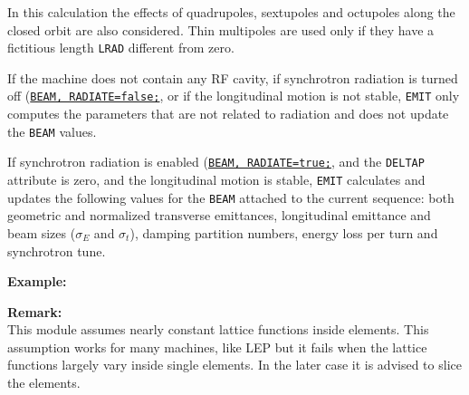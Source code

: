 In this calculation the effects of quadrupoles, sextupoles and
octupoles along the closed orbit are also considered. Thin multipoles are
used only if they have a fictitious length \texttt{LRAD} different from zero.  

If the machine does not contain any RF cavity, if synchrotron radiation is
turned off (\hyperref[sec:beam]{\texttt{BEAM, RADIATE=false;}}, or if the longitudinal
motion is not stable, \texttt{EMIT} only computes the parameters that
are not related to radiation and does not update the \texttt{BEAM} values.

If synchrotron radiation is enabled (\hyperref[sec:beam]{\texttt{BEAM, RADIATE=true;}}, 
and the \texttt{DELTAP} attribute is zero, and the longitudinal motion is stable, 
\texttt{EMIT} calculates and updates the following values for the \texttt{BEAM} attached 
to the current sequence: both geometric and normalized transverse emittances, 
longitudinal emittance and beam sizes ($\sigma_E$ and $\sigma_t$), 
damping partition numbers, energy loss per turn and synchrotron tune.


\textbf{Example:}

\textbf{Remark:}\\
This module assumes nearly constant lattice functions
inside elements. This assumption works for many machines, like LEP
but it fails when the lattice functions largely vary inside single
elements. In the later case it is advised to slice the elements.


